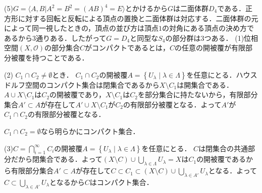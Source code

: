 \documentclass[
		book,
		head_space=20mm,
		foot_space=20mm,
		gutter=10mm,
		line_length=190mm
]{jlreq}
\begin{document}
    (5)$G=\langle A,B | A^2=B^2=(AB)^4=E\rangle$とかけるから$G$は二面体群$D_4$である．正方形に対する回転と反転による頂点の置換と二面体群は対応する．二面体群の元によって同一視したときの，頂点の並び方は頂点$1$の対角にある頂点の決め方であるから$3$通りある．したがって$G=D_4$と同型な$S_4$の部分群は$3$つある．
    (1)位相空間$(X,\mathcal{O})$の部分集合$C$がコンパクトであるとは，$C$の任意の開被覆が有限部分被覆を持つことである．

    (2)
    $C_1 \cap C_2 \neq \emptyset$とき．
    $C_1 \cap C_2$の開被覆$A=\left\{ U_{\lambda}\mid \lambda \in \Lambda \right\}$を任意にとる．ハウスドルフ空間のコンパクト集合は閉集合であるから$X \setminus C_1$は開集合である．$A\cup X\setminus C_1$は$C_2$の開被覆であり，$X \setminus C_1$は$C_2$を部分集合に持たないから，有限部分集合$A' \subset A$が存在して$A'\cup X\setminus C_1$が$C_2$の有限部分被覆となる．よって$A'$が$C_1 
    \cap C_2$の有限部分被覆となる．

    $C_1 \cap C_2 = \emptyset$なら明らかにコンパクト集合．

    (3)$C=\bigcap\limits_{i=1}^{\infty} C_i $の開被覆$A=\left\{ U_{\lambda}\mid \lambda \in \Lambda \right\}$を任意にとる．
    $C$は閉集合の共通部分だから閉集合である．よって$(X\setminus C )\cup \bigcup\limits_{\lambda \in \Lambda} U_{\lambda}=X$は$C_1$の開被覆であるから有限部分集合$A'\subset A$が存在して$C \subset C_1 \subset (X\setminus C) \cup \bigcup\limits_{\lambda \in A'} U_{\lambda}$となる．よって$C \subset \bigcup\limits_{\lambda \in A'} U_{\lambda}$となるから$C$はコンパクト集合．
    
\end{document}

